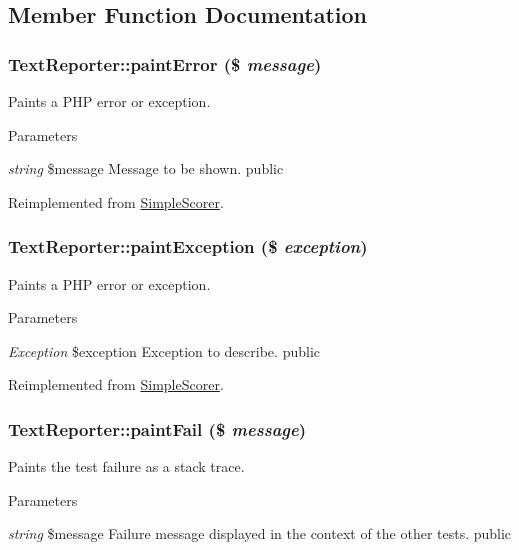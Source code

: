\subsection{Member Function Documentation}
\hypertarget{class_text_reporter_a1318de43ace9fbf493eef1aa6059c0da}{
\subsubsection[{paintError}]{\setlength{\rightskip}{0pt plus 5cm}TextReporter::paintError (\$ {\em message})}}
\label{class_text_reporter_a1318de43ace9fbf493eef1aa6059c0da}
Paints a PHP error or exception. 
\begin{DoxyParams}{Parameters}
\item[{\em string}]\$message Message to be shown.  public  \end{DoxyParams}


Reimplemented from \hyperlink{class_simple_scorer_ac33eeacd9e121f39874f95eec7219b88}{SimpleScorer}.\hypertarget{class_text_reporter_a277a5065cf8be1cd0ea7880d7e599d51}{
\subsubsection[{paintException}]{\setlength{\rightskip}{0pt plus 5cm}TextReporter::paintException (\$ {\em exception})}}
\label{class_text_reporter_a277a5065cf8be1cd0ea7880d7e599d51}
Paints a PHP error or exception. 
\begin{DoxyParams}{Parameters}
\item[{\em Exception}]\$exception Exception to describe.  public  \end{DoxyParams}


Reimplemented from \hyperlink{class_simple_scorer_af85813652ea0ec8aca7261267c121f6c}{SimpleScorer}.\hypertarget{class_text_reporter_a2163ad5700b27e62efe530849664db5d}{
\subsubsection[{paintFail}]{\setlength{\rightskip}{0pt plus 5cm}TextReporter::paintFail (\$ {\em message})}}
\label{class_text_reporter_a2163ad5700b27e62efe530849664db5d}
Paints the test failure as a stack trace. 
\begin{DoxyParams}{Parameters}
\item[{\em string}]\$message Failure message displayed in the context of the other tests.  public \end{DoxyParams}


